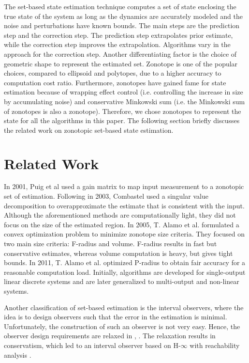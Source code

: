 The set-based state estimation technique computes a set of state enclosing the true state of the system as long as the dynamics are accurately modeled and the noise and perturbations have known bounds. The main steps are the prediction step and the correction step. The prediction step extrapolates prior estimate, while the correction step improves the extrapolation. Algorithms vary in the approach for the correction step. Another differentiating factor is the choice of geometric shape to represent the estimated set. Zonotope is one of the popular choices, compared to ellipsoid and polytopes, due to a higher accuracy to computation cost ratio. Furthermore, zonotopes have gained fame for state estimation because of wrapping effect control \cite{Kuhn1998} (i.e. controlling the increase in size by accumulating noise) and conservative Minkowski sum (i.e. the Minkowski sum of zonotopes is also a zonotope). Therefore, we chose zonotopes to represent the state for all the algorithms in this paper. The following section briefly discusses the related work on zonotopic set-based state estimation.


\section{Related Work}
In 2001, Puig et al \cite{Puig2001} used a gain matrix to map input measurement to a zonotopic set of estimation. Following in 2003, Combastel \cite{Combastel2003} used a singular value decomposition to overapproximate the estimate that is consistent with the input. Although the aforementioned methods are computationally light, they did not focus on the size of the estimated region. In 2005, T. Alamo et al. \cite{Alamo2005} formulated a convex optimization problem to minimize zonotope size criteria. They focused on two main size criteria: F-radius and volume. F-radius results in fast but conservative estimates, whereas volume computation is heavy, but gives tight bounds. In 2011, T. Alamo et al. \cite{Le2012} optimized P-radius to obtain fair accuracy for a reasonable computation load. Initially, algorithms are developed for single-output linear discrete systems and are later generalized to multi-output and non-linear systems.  

Another classification of set-based estimation is the interval observers, where the idea is to design observers such that the error in the estimation is minimal. Unfortunately, the construction of such an observer is not very easy. Hence, the observer design requirements are relaxed in  \cite{Mazenc2011}, \cite{Raissi2012}. The relaxation results in conservatism, which led to an interval observer based on H-$\infty$ with reachability analysis \cite{Tang2019}.

